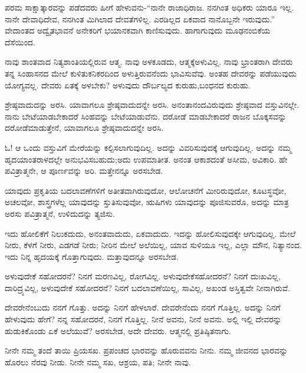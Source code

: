 \vskip 6pt

ಪರಮ ಸಾಕ್ಷಾತ್ಕಾರವನ್ನು ಪಡೆದವರು ಹೀಗೆ ಹೇಳುವನು-“ನಾನೇ ರಾಜಾಧಿರಾಜ. ನನ\-ಗಿಂತ ಅಧಿಕರು ಯಾರೂ ಇಲ್ಲ. ನಾನೇ ದೇವಾಧಿದೇವ, ನನಗಿಂತ ಮಿಗಿಲಾದ ದೇವತೆ\-ಗಳಿಲ್ಲ. ಎರಡಿಲ್ಲದ ಏಕವಾದ ನಾನೊಬ್ಬನೇ ಇರುವುದು.” ವೇದಾಂತದ ಅದ್ವೈತ\break ಭಾವನೆ ಅನೇಕರಿಗೆ ಭಯಾನಕವಾಗಿ ಕಾಣಿಸುವುದು. ಹಾಗಾಗುವುದು ಮೂಢನಂಬಿಕೆಯ ದೆಸೆಯಿಂದ.

\vskip 6pt

ನಾವು ಶಾಂತವಾದ ನಿತ್ಯಶಾಂತಿಯಲ್ಲಿರುವ ಆತ್ಮ. ನಾವು ಅಳಕೂಡದು, ಆತ್ಮಕ್ಕೆ\break ಅಳುವಿಲ್ಲ. ನಾವು ಭ್ರಾಂತರಾಗಿ ದೇವರು ತನ್ನ ಸಿಂಹಾಸನದ ಮೇಲೆ ಕುಳಿತು\break ಕನಿಕರದಿಂದ ಅಳುತ್ತಿರುವನೆಂದು ಭಾವಿಸುವೆವು. ಅಂತಹ ದೇವರನ್ನು ಪಡೆಯುವುದು ಯೋಗ್ಯವಲ್ಲ. ದೇವರು ಏತಕ್ಕೆ ಅಳಬೇಕು? ಅಳುವುದು ದೌರ್ಬಲ್ಯದ ಕುರುಹು,\break ಬಂಧನದ ಕುರುಹು.

ಶ್ರೇಷ್ಠವಾದುದನ್ನು ಅರಸಿ. ಯಾವಾಗಲೂ ಶ್ರೇಷ್ಠವಾದುದನ್ನೇ ಅರಸಿ. ಅನಂತಾನಂದ\-ವಿರುವುದು ಶ್ರೇಷ್ಠವಾದ ವಸ್ತುವಿನಲ್ಲೇ. ನಾನು ಬೇಟೆಯಾಡಬೇಕಾದರೆ ಸಿಂಹವನ್ನು ಬೇಟೆಯಾಡುವೆನು. ದರೋಡೆ ಮಾಡಬೇಕಾದರೆ ರಾಜನ ಬೊಕ್ಕಸವನ್ನು ದರೋಡೆ\break ಮಾಡುತ್ತೇನೆ, ಯಾವಾಗಲೂ ಶ್ರೇಷ್ಠವಾದುದನ್ನೇ ಅರಸಿ.

ಓ! ಆ ಒಂದು ವಸ್ತುವಿಗೆ ಮೇರೆಯನ್ನು ಕಲ್ಪಿಸಲಾಗುವುದಿಲ್ಲ. ಅದನ್ನು ವಿವರಿಸುವುದಕ್ಕೆ ಆಗುವುದಿಲ್ಲ. ಅದನ್ನು ನಮ್ಮ ಹೃದಯಾಂತರಾಳದಲ್ಲೇ ಅನುಭವಿಸಬಹುದು;\break ಅದು ಉಪಮಾತೀತ. ಅನಂತ ಆಕಾಶದಂತೆ ಅಸೀಮ, ಅವಿಕಾರಿ. ಹೇ ಪವಿತ್ರಾತ್ಮನೇ, ಆ ಪೂರ್ಣವನ್ನು ಅರಿ. ಮತ್ತೇನನ್ನೂ ಅರಸಬೇಡ.

ಯಾವುದು ಪ್ರಕೃತಿಯ ಬದಲಾವಣೆಗಳಿಗೆ ಅತೀತವಾಗಿರುವುದೋ, ಆಲೋಚನೆಗೆ ಮೀರಿರುವುದೋ, ಕೂಟಸ್ಥವೋ, ಅಚಲವೋ, ಶಾಸ್ತ್ರಗಳೆಲ್ಲ ಯಾವುದನ್ನು ಸ್ತುತಿಸುವುವೋ, ಋಷಿಗಳು ಯಾವುದನ್ನು ಪೂಜಿಸುವರೊ, ಅದನ್ನು ಮಾತ್ರ ಅರಸು ಪವಿತ್ರಾತ್ಮನೆ, ಉಳಿದುದನ್ನು ತ್ಯಜಿಸು.

ಇದು ಹೋಲಿಕೆಗೆ ನಿಲುಕದುದು, ಅನಂತವಾದುದು, ಏಕವಾದುದು. ಇದನ್ನು ಹೋಲಿಸುವುದಕ್ಕೇ ಆಗುವುದಿಲ್ಲ. ಮೇಲೆ ನೀರು, ಕೆಳಗೆ ನೀರು, ಎಡಗಡೆ ನೀರು; ನೀರಿನ ಮೇಲೆ ಅಲೆಯಿಲ್ಲ, ಯಾವ ಸುಳಿಯೂ ಇಲ್ಲ, ಎಲ್ಲಾ ಮೌನ, ನಿತ್ಯಾನಂದ. ಇದು ನಿನ್ನ ಹೃದಯಕ್ಕೆ ಗೊತ್ತಾಗುವುದು. ಮತ್ತಾವುದನ್ನೂ ಅರಸಬೇಡ.

ಅಳುವುದೇಕೆ ಸಹೋದರನೆ? ನಿನಗೆ ಮರಣವಿಲ್ಲ, ರೋಗವಿಲ್ಲ. ಅಳುವುದೇಕೆ\break ಸಹೋದರನೆ? ನಿನಗೆ ದುಃಖವಿಲ್ಲ, ದಾರಿದ್ರ್ಯವಿಲ್ಲ, ಅಳುವುದೇಕೆ ಸಹೋದರನೆ? ನಿನಗೆ ಬದಲಾವಣೆಯಿಲ್ಲ, ಸಾವಿಲ್ಲ, ಅಖಂಡ ಅಸ್ತಿತ್ವವೇ ನೀನಾಗಿರುವೆ.

ದೇವರೇನೆಂಬುದು ನನಗೆ ಗೊತ್ತು. ಅದನ್ನು ನಿನಗೆ ಹೇಳಲಾರೆ. ದೇವರೇನೆಂದು ನನಗೆ ಗೊತ್ತಿಲ್ಲ. ಅದನ್ನು ನಿನಗೆ ಹೇಳುವುದು ಹೇಗೆ? ನನ್ನ ಸಹೋದರನೆ, ನಿನಗೆ ಗೊತ್ತಿಲ್ಲ. ನೀನೆ ಅವನು, ನೀನೆ ಅವನು. ಅಲ್ಲಿ ಇಲ್ಲಿ ದೇವರನ್ನು ಹುಡುಕಿಕೊಂಡು ಏಕೆ ಅಲೆಯುವೆ? ಅರಸಬೇಡ, ಅದೇ ದೇವರು. ಆತ್ಮನಲ್ಲಿ ಪ್ರತಿಷ್ಠಿತನಾಗು.

ನೀನೇ ನಮ್ಮ ತಂದೆ ತಾಯಿ ಪ್ರಿಯಸಖ. ಪ್ರಪಂಚದ ಭಾರವನ್ನು ಹೊರುವವನು ನೀನು. ನಮ್ಮ ಜೀವನದ ಭಾರವನ್ನು ಹೊರಲು ನೆರವು ನೀಡು. ನೀನೇ ನಮ್ಮ ಸಖ, ಆಶ್ರಯ, ಪತಿ; ನೀನೇ ನಾವು.

